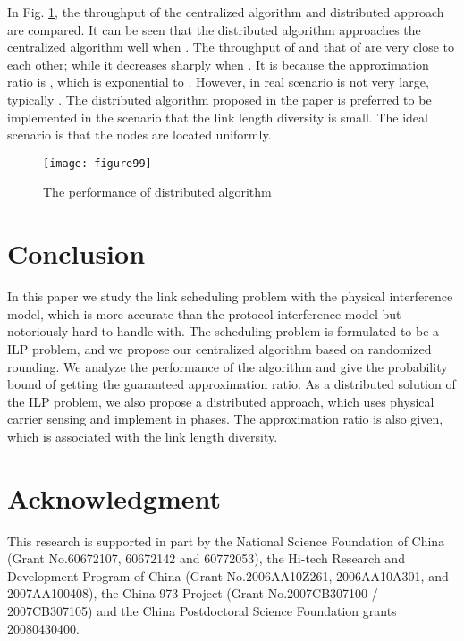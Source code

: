 \documentclass[conference]{IEEEtran}
\begin{document}
In Fig. \ref{Fig:Performance of distributed algorithm}, the
throughput of the centralized algorithm and distributed approach are
compared. It can be seen that the distributed algorithm approaches
the centralized algorithm well when . The throughput of 
and that of  are very close to each other; while it decreases
sharply when . It is because the approximation ratio is
, which is exponential to . However, in real
scenario  is not very large, typically . The distributed
algorithm proposed in the paper is preferred to be implemented in
the scenario that the link length diversity is small. The ideal
scenario is that the nodes are located uniformly.
\begin{figure}[!h]
\centering
\texttt{[image: figure99]}
\caption{The performance of distributed algorithm}
\label{Fig:Performance of distributed algorithm}
\end{figure}
\section{Conclusion}\label{section7}
In this paper we study the link scheduling problem with the physical
interference model, which is more accurate than the protocol
interference model but notoriously hard to handle with. The
scheduling problem is formulated to be a ILP problem, and we propose
our centralized algorithm based on randomized rounding. We analyze
the performance of the algorithm and give the probability bound of
getting the guaranteed approximation ratio. As a distributed
solution of the ILP problem, we also propose a distributed approach,
which uses physical carrier sensing and implement in phases. The
approximation ratio is also given, which is associated with the link
length diversity.
\renewcommand{\baselinestretch}{1}
\selectfont
\section*{Acknowledgment}
This research is supported in part by the National Science
Foundation of China (Grant No.60672107, 60672142 and 60772053), the
Hi-tech Research and Development Program of China (Grant
No.2006AA10Z261, 2006AA10A301, and 2007AA100408), the China 973
Project (Grant No.2007CB307100 / 2007CB307105) and the China
Postdoctoral Science Foundation grants 20080430400.

\end{document}
